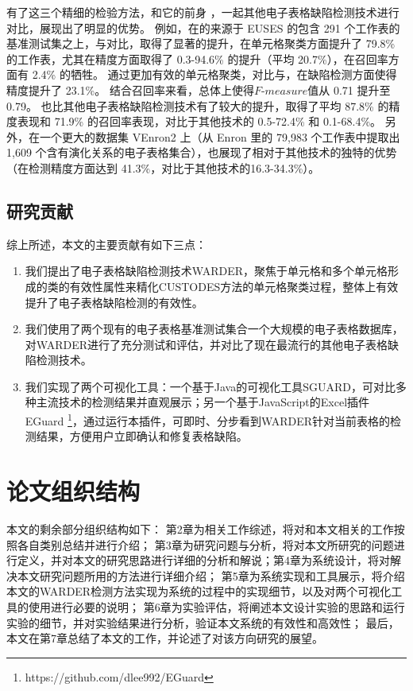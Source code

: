 有了这三个精细的检验方法，\wa 和它的前身 \cu，一起其他电子表格缺陷检测技术进行对比，展现出了明显的优势。
例如，在\cu 的来源于 EUSES \cite{fisher2005euses} 的包含 291 个工作表的基准测试集之上，\wa 与\cu 对比，取得了显著的提升，在单元格聚类方面提升了 79.8\% 的工作表，尤其在精度方面取得了 0.3-94.6\% 的提升（平均 20.7\%），在召回率方面有 2.4\% 的牺牲。
\wa 通过更加有效的单元格聚类，对比与\cu，在缺陷检测方面使得精度提升了 23.1\%。
结合召回率来看，总体上使得$F\text{-}measure$值从 0.71 提升至 0.79。
\wa 也比其他电子表格缺陷检测技术有了较大的提升，取得了平均 87.8\% 的精度表现和 71.9\% 的召回率表现，对比于其他技术的 0.5-72.4\% 和 0.1-68.4\%。
另外，在一个更大的数据集 VEnron2 \cite{xu2017spreadcluster} 上（从 Enron \cite{hermans2015enron} 里的 79,983 个工作表中提取出 1,609 个含有演化关系的电子表格集合），\wa 也展现了相对于其他技术的独特的优势（在检测精度方面达到 41.3\%，对比于其他技术的16.3-34.3\%）。

\subsection{研究贡献}

综上所述，本文的主要贡献有如下三点：

\begin{enumerate}
    \item 我们提出了电子表格缺陷检测技术WARDER，聚焦于单元格和多个单元格形成的类的有效性属性来精化CUSTODES方法的单元格聚类过程，整体上有效提升了电子表格缺陷检测的有效性。
    \item 我们使用了两个现有的电子表格基准测试集合一个大规模的电子表格数据库，对WARDER进行了充分测试和评估，并对比了现在最流行的其他电子表格缺陷检测技术。
    \item 我们实现了两个可视化工具：一个基于Java的可视化工具SGUARD\cite{li2019sguard}，可对比多种主流技术的检测结果并直观展示；另一个基于JavaScript的Excel插件 EGuard \footnote{https://github.com/dlee992/EGuard}，通过运行本插件，可即时、分步看到WARDER针对当前表格的检测结果，方便用户立即确认和修复表格缺陷。
\end{enumerate}

\section{论文组织结构}

本文的剩余部分组织结构如下：
第2章为相关工作综述，将对和本文相关的工作按照各自类别总结并进行介绍；
第3章为研究问题与分析，将对本文所研究的问题进行定义，并对本文的研究思路进行详细的分析和解说；第4章为系统设计，将对解决本文研究问题所用的方法进行详细介绍；
第5章为系统实现和工具展示，将介绍本文的WARDER检测方法实现为系统的过程中的实现细节，以及对两个可视化工具的使用进行必要的说明；
第6章为实验评估，将阐述本文设计实验的思路和运行实验的细节，并对实验结果进行分析，验证本文系统的有效性和高效性；
最后，本文在第7章总结了本文的工作，并论述了对该方向研究的展望。